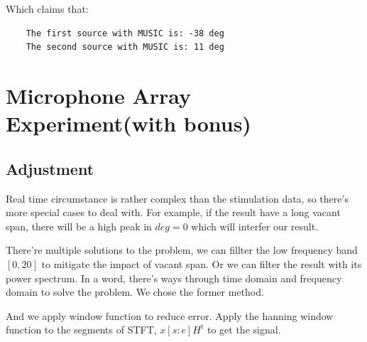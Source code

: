 \documentclass[UTF8]{article}
\begin{document}
Which claims that:
\begin{lstlisting}
    The first source with MUSIC is: -38 deg
    The second source with MUSIC is: 11 deg
\end{lstlisting}

\section{Microphone Array Experiment(with bonus)}
\subsection{Adjustment}
\hspace{0.5em} Real time circumstance is rather complex than the stimulation data, so there's more special cases to deal with. For example, if the result have a long vacant span, there will be a high peak in $deg = 0$ which will interfer our result.

There're multiple solutions to the problem, we can fillter the low frequency band $[0, 20]$ to mitigate the impact of vacant span. Or we can filter the result with its power spectrum. In a word, there's ways through time domain and frequency domain to solve the problem. We chose the former method.

And we apply window function to reduce error. Apply the hanning window function to the segments of STFT, $x[s:e]H^t$ to get the signal.
\end{document}
